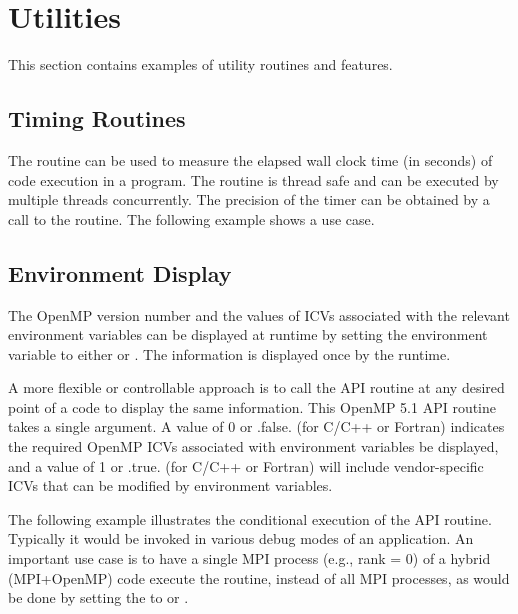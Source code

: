 \pagebreak
\section{Utilities}
\label{sec:utilities}
This section contains examples of utility routines and features.

\subsection{Timing Routines}
\label{subsec:get_wtime}

The  routine can be used to measure the elapsed wall
clock time (in seconds) of code execution in a program.
The routine is thread safe and can be executed by multiple threads concurrently.
The precision of the timer can be obtained by a call to
the  routine. The following example shows a use case.




\subsection{Environment Display}
\label{subsec:display_env}

The OpenMP version number and the values of ICVs associated with the relevant
environment variables can be displayed at runtime by setting 
the  environment variable to either 
 or .
The information is displayed once by the runtime.

A more flexible or controllable approach is to call 
the  API routine at any desired
point of a code to display the same information.
This OpenMP 5.1 API routine takes a single  argument.
A value of 0 or .false. (for C/C++ or Fortran) indicates
the required OpenMP ICVs associated with environment variables be displayed,
and a value of 1 or .true. (for C/C++ or Fortran) will include
vendor-specific ICVs that can be modified by environment variables.

The following example illustrates the conditional execution of the API
 routine.  Typically it would be invoked in
various debug modes of an application. 
An important use case is to have a single MPI process (e.g., rank = 0) 
of a hybrid (MPI+OpenMP) code execute the routine,
instead of all MPI processes, as would be done by 
setting the  to  or .

